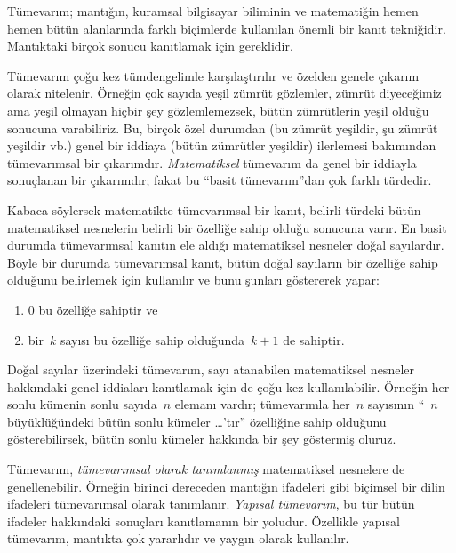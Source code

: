 \documentclass[../../../include/open-logic-section]{subfiles}
\begin{document}


Tümevarım; mantığın, kuramsal bilgisayar biliminin ve matematiğin hemen
hemen bütün alanlarında farklı biçimlerde kullanılan önemli bir kanıt
tekniğidir. Mantıktaki birçok sonucu kanıtlamak için gereklidir.

Tümevarım çoğu kez tümdengelimle karşılaştırılır ve özelden genele
çıkarım olarak nitelenir. Örneğin çok sayıda yeşil zümrüt gözlemler,
zümrüt diyeceğimiz ama yeşil olmayan hiçbir şey gözlemlemezsek, bütün
zümrütlerin yeşil olduğu sonucuna varabiliriz. Bu, birçok özel durumdan
(bu zümrüt yeşildir, şu zümrüt yeşildir vb.) genel bir iddiaya (bütün
zümrütler yeşildir) ilerlemesi bakımından tümevarımsal bir çıkarımdır.
\emph{Matematiksel} tümevarım da genel bir iddiayla sonuçlanan bir
çıkarımdır; fakat bu ``basit tümevarım''dan çok farklı türdedir.

Kabaca söylersek matematikte tümevarımsal bir kanıt, belirli türdeki
bütün matematiksel nesnelerin belirli bir özelliğe sahip olduğu sonucuna
varır. En basit durumda tümevarımsal kanıtın ele aldığı matematiksel
nesneler doğal sayılardır. Böyle bir durumda tümevarımsal kanıt, bütün
doğal sayıların bir özelliğe sahip olduğunu belirlemek için kullanılır
ve bunu şunları göstererek yapar:
\begin{enumerate}
    \item $0$ bu özelliğe sahiptir ve
    \item bir~$k$ sayısı bu özelliğe sahip olduğunda~$k+1$ de sahiptir.
\end{enumerate}
Doğal sayılar üzerindeki tümevarım, sayı atanabilen matematiksel
nesneler hakkındaki genel iddiaları kanıtlamak için de çoğu kez
kullanılabilir. Örneğin her sonlu kümenin sonlu sayıda~$n$ elemanı
vardır; tümevarımla her~$n$ sayısının ``~$n$ büyüklüğündeki bütün sonlu
kümeler \dots'tır'' özelliğine sahip olduğunu gösterebilirsek, bütün
sonlu kümeler hakkında bir şey göstermiş oluruz.

Tümevarım, \emph{tümevarımsal olarak tanımlanmış} matematiksel nesnelere
de genellenebilir. Örneğin birinci dereceden mantığın ifadeleri gibi
biçimsel bir dilin ifadeleri tümevarımsal olarak tanımlanır.
\emph{Yapısal tümevarım}, bu tür bütün ifadeler hakkındaki sonuçları
kanıtlamanın bir yoludur. Özellikle yapısal tümevarım, mantıkta çok
yararlıdır ve yaygın olarak kullanılır.
\end{document}
